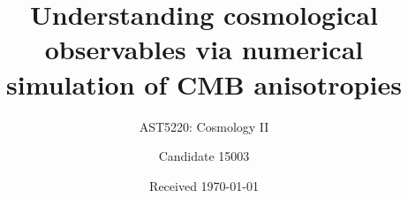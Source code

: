 \documentclass[a4paper]{aa} %
\begin{document}
 


   \title{Understanding cosmological observables via numerical simulation of CMB anisotropies}

   \subtitle{AST5220: Cosmology II}

   \author{Candidate 15003
          }


   \date{Received \today}









%

\FloatBarrier






\end{document}
